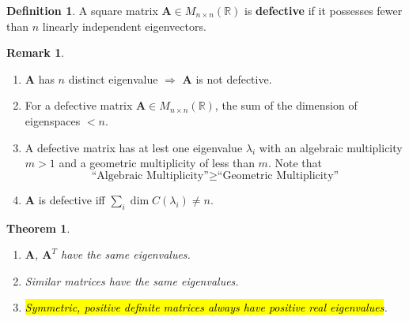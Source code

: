\documentclass[12pt,openany]{book}
\newtheorem{theorem}{Theorem}[chapter]
\theoremstyle{definition}
\newtheorem{definition}{Definition}[chapter]
\newtheorem{remark}{Remark}[chapter]
\newcommand{\R}{\mathbb{R}}
\newcommand{\by}{\times}
\begin{document}
	\begin{tcolorbox}[colframe=defcolor,title={\color{white}\bf Defective}]
		\begin{definition}
			A square matrix \(\textbf{A}\in M_{n\by n}(\R)\) is \textbf{defective} if it possesses fewer than \(n\) linearly independent eigenvectors.
		\end{definition}
	\end{tcolorbox}
	\begin{remark}
		\ \begin{enumerate}[(1)]
			\item \(\textbf{A}\) has \(n\) distinct eigenvalue \(\Rightarrow\) \textbf{A} is not defective.
			\item For a defective matrix \(\textbf{A}\in M_{n\by n}(\R)\), the sum of the dimension of eigenspaces \(<n\).
			\item A defective matrix has at lest one eigenvalue \(\lambda_i\) with an algebraic multiplicity \(m>1\) and a geometric multiplicity of less than \(m\). Note that \[
			\text{``Algebraic Multiplicity''}\geq\text{``Geometric Multiplicity''}
			\]
			\item \(\textbf{A}\) is defective iff \(\sum_i\dim C(\lambda_i)\neq n\).
		\end{enumerate}
	\end{remark}
	\vspace{4pt}
	\begin{tcolorbox}[colframe=thmcolor,title={\color{white}\bf }]
		\begin{theorem}
			\ \begin{enumerate}[(1)]
				\item $\textbf{A}$, $\textbf{A}^T$ have the same eigenvalues.
				\item Similar matrices have the same eigenvalues.
				\item \hl{Symmetric, positive definite matrices always have positive real eigenvalues}.
			\end{enumerate}
		\end{theorem}
	\end{tcolorbox}
\end{document}
